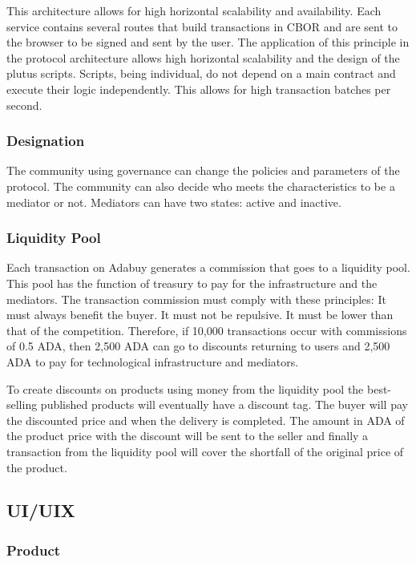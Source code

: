 \documentclass[12pt]{article}
\begin{document}
This architecture allows for high horizontal scalability and availability. Each service contains several routes that build transactions in CBOR and are sent to the browser to be signed and sent by the user. 
The application of this principle in the protocol architecture allows high horizontal scalability and the design of the plutus scripts. Scripts, being individual, do not depend on a main contract and execute their logic independently. This allows for high transaction batches per second.


\subsubsection { Designation } 

The community using governance can change the policies and parameters of the protocol. The community can also decide who meets the characteristics to be a mediator or not.
Mediators can have two states: active and inactive.

\subsubsection { Liquidity Pool }

Each transaction on Adabuy generates a commission that goes to a liquidity pool. This pool has the function of treasury to pay for the infrastructure and the mediators.
The transaction commission must comply with these principles: It must always benefit the buyer. It must not be repulsive. It must be lower than that of the competition. Therefore, if 10,000 transactions occur with commissions of 0.5 ADA, then 2,500 ADA can go to discounts returning to users and 2,500 ADA to pay for technological infrastructure and mediators. 

To create discounts on products using money from the liquidity pool the best-selling published products will eventually have a discount tag. The buyer will pay the discounted price and when the delivery is completed. The amount in ADA of the product price with the discount will be sent to the seller and finally a transaction from the liquidity pool will cover the shortfall of the original price of the product.

\subsection{ UI/UIX }

\subsubsection { Product } 
\end{document}
